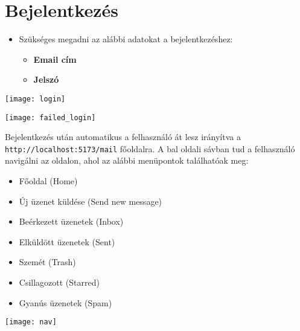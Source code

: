 ﻿\chapter{Bejelentkezés}

\begin{itemize}
    \item Szükséges megadni az alábbi adatokat a bejelentkezéshez:
    \begin{itemize}
        \item \textbf{Email cím}
        \item \textbf{Jelszó}
    \end{itemize}
\end{itemize}
\begin{minipage}[h]{0.5\textwidth}
    \begin{center}
        \texttt{[image: login]}
    \end{center}
\end{minipage}%
\begin{minipage}[h]{0.5\textwidth}
    \begin{center}
        \texttt{[image: failed\_login]}
    \end{center}
\end{minipage}%
\begin{flushleft}
    Bejelentkezés után automatikus a felhasználó át lesz irányítva a \verb|http://localhost:5173/mail| főoldalra. A bal oldali sávban tud a felhasználó navigálni az oldalon, ahol az alábbi menüpontok találhatóak meg:
    \begin{minipage}[h]{0.5\textwidth}
        \begin{itemize}
            \item Főoldal (Home)
            \item Új üzenet küldése (Send new message)
            \item Beérkezett üzenetek (Inbox)
            \item Elküldött üzenetek (Sent)
            \item Szemét (Trash)
            \item Csillagozott (Starred)
            \item Gyanús üzenetek (Spam)
        \end{itemize}
    \end{minipage}%
    \begin{minipage}[h]{0.5\textwidth}
        \begin{center}
            \texttt{[image: nav]}
        \end{center}
    \end{minipage}%
    
\end{flushleft}